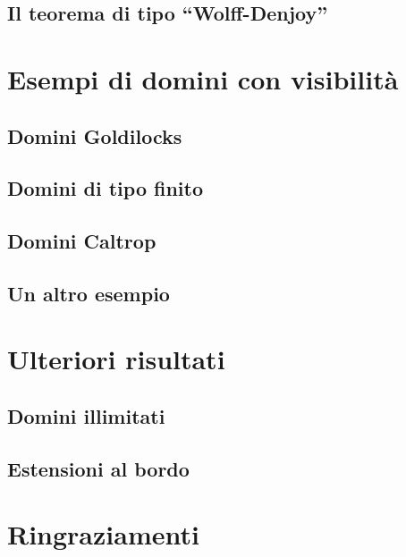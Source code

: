 \documentclass{article}
\begin{document}
\subsection{Il teorema di tipo ``Wolff-Denjoy''}


\newpage

\section{Esempi di domini con visibilità} \label{Esempi di domini con visibilità}

\subsection{Domini Goldilocks}

\subsection{Domini di tipo finito}

\subsection{Domini Caltrop}

\subsection{Un altro esempio}


\newpage

\section{Ulteriori risultati} \label{Ulteriori risultati}
\subsection{Domini illimitati}

\subsection{Estensioni al bordo}


\newpage



\newpage

\section*{Ringraziamenti}

\end{document}
